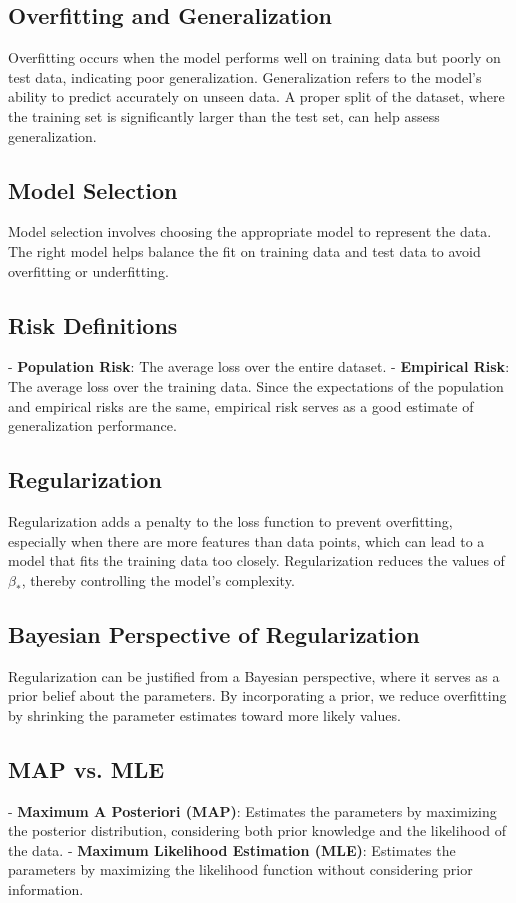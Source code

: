 \documentclass[10pt]{article}
\begin{document}
\begin{multicols}{2}
\subsection*{Overfitting and Generalization}
Overfitting occurs when the model performs well on training data but poorly on test data, indicating poor generalization. Generalization refers to the model's ability to predict accurately on unseen data. A proper split of the dataset, where the training set is significantly larger than the test set, can help assess generalization.

\subsection*{Model Selection}
Model selection involves choosing the appropriate model to represent the data. The right model helps balance the fit on training data and test data to avoid overfitting or underfitting.

\subsection*{Risk Definitions}
- \textbf{Population Risk}: The average loss over the entire dataset.
- \textbf{Empirical Risk}: The average loss over the training data. Since the expectations of the population and empirical risks are the same, empirical risk serves as a good estimate of generalization performance.

\subsection*{Regularization}
Regularization adds a penalty to the loss function to prevent overfitting, especially when there are more features than data points, which can lead to a model that fits the training data too closely. Regularization reduces the values of \( \beta_* \), thereby controlling the model's complexity.

\subsection*{Bayesian Perspective of Regularization}
Regularization can be justified from a Bayesian perspective, where it serves as a prior belief about the parameters. By incorporating a prior, we reduce overfitting by shrinking the parameter estimates toward more likely values.

\subsection*{MAP vs. MLE}
- \textbf{Maximum A Posteriori (MAP)}: Estimates the parameters by maximizing the posterior distribution, considering both prior knowledge and the likelihood of the data.
- \textbf{Maximum Likelihood Estimation (MLE)}: Estimates the parameters by maximizing the likelihood function without considering prior information.


\end{multicols}
\end{document}
